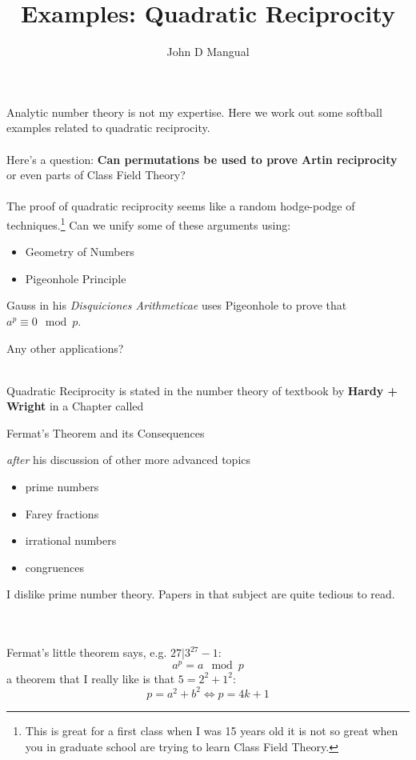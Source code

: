 \documentclass[12pt]{article}
\title{\textbf{ Examples:  Quadratic Reciprocity}}
\author{John D Mangual}
\date{}
\begin{document}
\selectfont \fontsize{25}{30}\selectfont

\maketitle

\noindent Analytic number theory is not my expertise.  Here we work out some softball examples related to quadratic reciprocity. \\ \\
Here's a question: \textbf{Can permutations be used to prove Artin reciprocity} or even parts of Class Field Theory? \\ \\
The proof of quadratic reciprocity seems like a random hodge-podge of techniques.\footnote{This is great for a first class when I was 15 years old it is not so great when you in graduate school are trying to learn Class Field Theory.} Can we unify some of these arguments using:
\begin{itemize}
\item Geometry of Numbers
\item Pigeonhole Principle
\end{itemize}
Gauss in his \textit{Disquiciones Arithmeticae} uses Pigeonhole to prove that $a^p \equiv 0 \mod p$. 

\newpage 

\noindent Any other applications? \\
 \\
Quadratic Reciprocity is stated in the number theory of textbook by \textbf{Hardy + Wright} in a Chapter called 
\begin{center} {\color{green!80!white}Fermat's Theorem and its Consequences}\end{center} \textit{after} his discussion of other more advanced topics
\begin{itemize}
\item prime numbers
\item Farey fractions
\item irrational numbers
\item congruences
\end{itemize}
I dislike prime number theory.  Papers in that subject are quite tedious to read.\\ 
 \\
\\
Fermat's little theorem says, e.g. $27| 3^{27}-1$:
$$ a^p = a \mod p$$
a theorem that I really like is that $5 = 2^2 + 1^2$:
$$ p = a^2 + b^2 \iff p = 4k+1 $$
\end{document}
